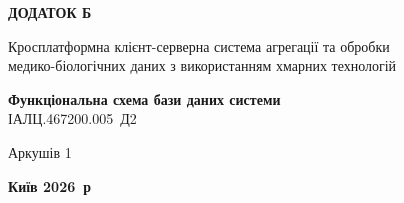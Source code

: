 \documentclass[%
  ukrainian, utf8, columnvii, simple,
  hpadding=10mm, vpadding=10mm, reduceheight=2mm,
  floatsection,
]{eskdtext}
\begin{document}
\thispagestyle{empty}
\begin{center}
\vspace*{3cm}
{\large\textbf{ДОДАТОК Б}}

\vspace{1.5cm}
{\normalsize Кросплатформна клієнт-серверна система агрегації та обробки\\
медико-біологічних даних з використанням хмарних технологій}

\vfill
{\large\textbf{Функціональна схема бази даних системи}}\\[0.6em]
{\normalsize ІАЛЦ.467200.005~Д2}

\vspace{2.5cm}
{\normalsize Аркушів 1}

\vfill
{\large\textbf{Київ 2026~р}}
\end{center}
\clearpage
{}
\end{document}
